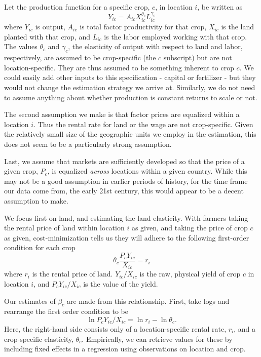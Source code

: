 \documentclass[11pt]{article}
\begin{document}
Let the production function for a specific crop, $c$, in location $i$, be written as
\begin{equation}
	Y_{ic} = A_{ic} X_{ic}^{\theta_c} L_{ic}^{\gamma_c}
\end{equation}
where $Y_{ic}$ is output, $A_{ic}$ is total factor productivity for that crop, $X_{ic}$ is the land planted with that crop, and $L_{ic}$ is the labor employed working with that crop. The values $\theta_c$ and $\gamma_c$, the elasticity of output with respect to land and labor, respectively, are assumed to be crop-specific (the $c$ subscript) but are not location-specific. They are thus assumed to be something inherent to crop $c$. We could easily add other inputs to this specification - capital or fertilizer - but they would not change the estimation strategy we arrive at. Similarly, we do not need to assume anything about whether production is constant returns to scale or not.

The second assumption we make is that factor prices are equalized within a location $i$. Thus the rental rate for land or the wage are not crop-specific. Given the relatively small size of the geographic units we employ in the estimation, this does not seem to be a particularly strong assumption.

Last, we assume that markets are sufficiently developed so that the price of a given crop, $P_c$, is equalized \textit{across} locations within a given country. While this may not be a good assumption in earlier periods of history, for the time frame our data come from, the early 21st century, this would appear to be a decent assumption to make. 

We focus first on land, and estimating the land elasticity. With farmers taking the rental price of land within location $i$ as given, and taking the price of crop $c$ as given, cost-minimization tells us they will adhere to the following first-order condition for each crop
\begin{equation}
	\theta_c \frac{P_c Y_{ic}}{X_{ic}} = r_i
\end{equation}
where $r_i$ is the rental price of land. $Y_{ic}/X_{ic}$ is the raw, physical yield of crop $c$ in location $i$, and $P_c Y_{ic}/X_{ic}$ is the value of the yield.

Our estimates of $\beta_c$ are made from this relationship. First, take logs and rearrange the first order condition to be
\begin{equation}
	\ln P_c Y_{ic}/X_{ic} = \ln r_i - \ln \theta_c. 
\end{equation}
Here, the right-hand side consists only of a location-specific rental rate, $r_i$, and a crop-specific elasticity, $\theta_c$. Empirically, we can retrieve values for these by including fixed effects in a regression using observations on location and crop.
\end{document}
